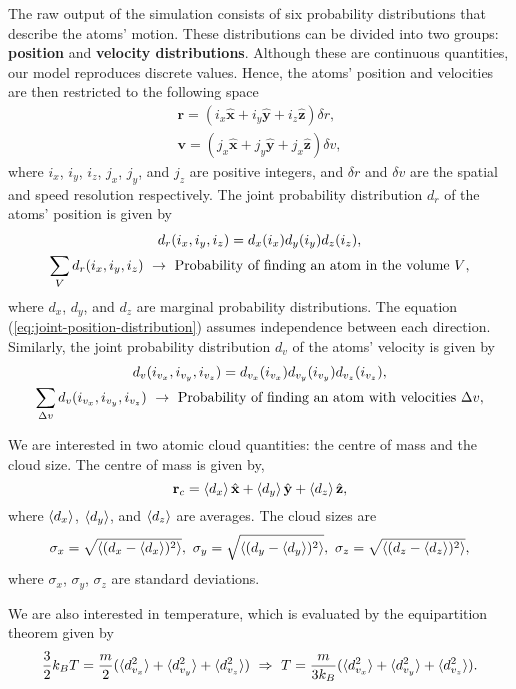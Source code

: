 The raw output of the simulation consists of six probability distributions that describe the atoms' motion. These distributions can be divided into two groups: \textbf{position} and \textbf{velocity distributions}. Although these are continuous quantities, our model reproduces discrete values. Hence, the atoms' position and velocities are then restricted to the following space
\begin{gather}
    \mathbf{r} = (i_x \hat{\mathbf{x}} + i_y \hat{\mathbf{y}} + i_z \hat{\mathbf{z}}) \delta r, \\
    \mathbf{v} = (j_x \hat{\mathbf{x}} + j_y \hat{\mathbf{y}} + j_x \hat{\mathbf{z}}) \delta v,
\end{gather}
where $ i_x $, $ i_y $, $ i_z $, $ j_x $, $ j_y $, and $ j_z $ are positive integers, and $ \delta r $ and $ \delta v $ are the spatial and speed resolution respectively. The joint probability distribution $d_r$ of the atoms' position is given by
\begin{gather}
    d_{r}(i_x, i_y, i_z) = d_x(i_x) d_y(i_y) d_z(i_z),
    \label{eq:joint-position-distribution}
    \\
    \sum_{V} d_r(i_x,i_y,i_z) \ \rightarrow\ \textrm{Probability of finding an atom in the volume $ V $},
\end{gather}
where $ d_{x} $, $ d_y $, and $ d_z $ are marginal probability distributions. The equation (\ref{eq:joint-position-distribution}) assumes independence between each direction. Similarly, the joint probability distribution $d_v$ of the atoms' velocity is given by
\begin{gather}
    d_{v}(i_{v_x}, i_{v_y}, i_{v_z}) = d_{v_x}(i_{v_x}) d_{v_y}(i_{v_y}) d_{v_z}(i_{v_z}),
    \label{eq:joint-velocity-distribution}
    \\
    \sum_{\Delta v} d_{v}(i_{v_x}, i_{v_y}, i_{v_z}) \ \rightarrow\ \textrm{Probability of finding an atom with velocities $ \Delta v $},
\end{gather}

We are interested in two atomic cloud quantities: the centre of mass and the cloud size. The centre of mass is given by,
\begin{equation}
    \mathbf{r}_c = \braket{d_x} \hat{\mathbf{x}} + \braket{d_y} \hat{\mathbf{y}} + \braket{d_z} \hat{\mathbf{z}},
    \label{eq:simulated-centre-of-mass}
\end{equation}
where $ \braket{d_x} $, $ \braket{d_y} $, and $ \braket{d_z} $ are averages. The cloud sizes are
\begin{equation}
    \sigma_x = \sqrt{\braket{(d_x - \braket{d_x})^2}},\ \sigma_y = \sqrt{\braket{(d_y - \braket{d_y})^2}},\ \sigma_z = \sqrt{\braket{(d_z - \braket{d_z})^2}},
    \label{eq:simulated-cloud-sizes}
\end{equation}
where $ \sigma_x $, $ \sigma_y $, $ \sigma_z $ are standard deviations.

We are also interested in temperature, which is evaluated by the equipartition theorem given by
\begin{equation}
    \frac{3}{2}k_B T = \frac{m}{2} (\braket{d_{v_x}^2} + \braket{d_{v_y}^2} + \braket{d_{v_z}^2})\ \Rightarrow\ T = \frac{m}{3k_B} (\braket{d_{v_x}^2} + \braket{d_{v_y}^2} + \braket{d_{v_z}^2}).
\end{equation}
